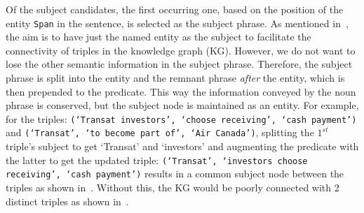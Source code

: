 Of the subject candidates, the first occurring one, based on the position of the entity \texttt{Span} in the sentence, is selected as the subject phrase. As mentioned in~, the aim is to have just the named entity as the subject to facilitate the connectivity of triples in the knowledge graph (KG). However, we do not want to lose the other semantic information in the subject phrase. Therefore, the subject phrase is split into the entity and the remnant phrase \textit{after} the entity, which is then prepended to the predicate. This way the information conveyed by the noun phrase is conserved, but the subject node is maintained as an entity. For example, for the triples: \texttt{(`Transat investors', `choose receiving', `cash payment')} and \texttt{(`Transat', `to become part of', `Air Canada')}, splitting the $1^{st}$ triple's subject to get `Transat' and `investors' and augmenting the predicate with the latter to get the updated triple: \texttt{(`Transat', `investors choose receiving', `cash payment')} results in a common subject node between the triples as shown in~. Without this, the KG would be poorly connected with 2 distinct triples as shown in~.
  
